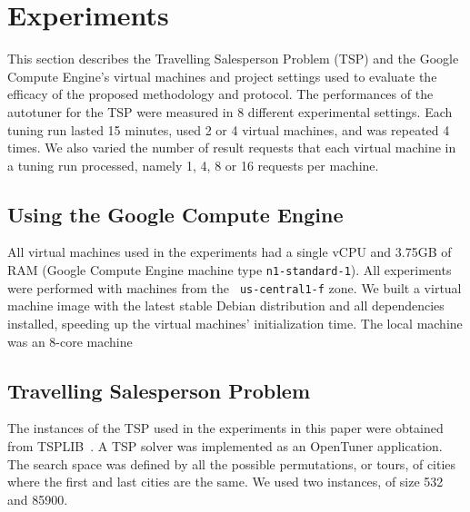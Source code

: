 \section{Experiments} \label{sec:exp}

This section describes the Travelling Salesperson Problem (TSP) and the Google
Compute Engine's virtual machines and project settings used to evaluate the
efficacy of the proposed methodology and protocol.  The performances of
the autotuner for the TSP were measured in 8 different
experimental settings. Each tuning run lasted 15 minutes, used 2 or 4
virtual machines, and was repeated 4 times.  We also varied the number of
result requests that each virtual machine in a tuning run processed, namely 1,
4, 8 or 16 requests per machine.

\subsection{Using the Google Compute Engine}

All virtual machines used in the experiments had a single vCPU and 3.75GB of
RAM (Google Compute Engine machine type \texttt{\footnotesize n1-standard-1}).
All experiments were performed with machines from the \texttt{\footnotesize
us-central1-f} zone. We built a virtual machine image with the latest stable
Debian distribution and all dependencies installed, speeding up the virtual
machines' initialization time. The local machine was an 8-core machine

\subsection{Travelling Salesperson Problem}

The instances of the TSP used in the
experiments in this paper were obtained from TSPLIB~\cite{reinelt1991tsplib}.
A TSP solver was implemented as an OpenTuner application. The search space was
defined by all the possible permutations, or tours, of cities where the first
and last cities are the same. We used two instances, of size 532 and 85900.
